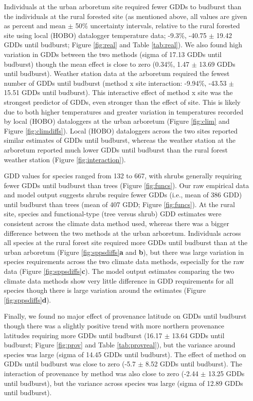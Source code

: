 \documentclass{article}\usepackage[]{graphicx}\usepackage[]{color}
\begin{document}
Individuals at the urban arboretum site required fewer GDDs to budburst than the individuals at the rural forested site (as mentioned above, all values are given as percent and mean $\pm$ 50\% uncertainty intervals, relative to the rural forested site using local (HOBO) datalogger temperature data; -9.3\%, -40.75 $\pm$ 19.42 GDDs until budburst; Figure \ref{fig:real} and Table \ref{tab:real}). We also found high variation in GDDs between the two methods (sigma of 17.13 GDDs until budburst) though the mean effect is close to zero (0.34\%, 1.47 $\pm$ 13.69 GDDs until budburst). Weather station data at the arboretum required the fewest number of GDDs until budburst (method x site interaction: -9.94\%, -43.53 $\pm$ 15.51 GDDs until budburst). This interactive effect of method x site was the strongest predictor of GDDs, even stronger than the effect of site. This is likely due to both higher temperatures and greater variation in temperatures recorded by local (HOBO) dataloggers at the urban arboretum (Figure \ref{fig:clim} and Figure \ref{fig:climdiffs}). Local (HOBO) dataloggers across the two sites reported similar estimates of GDDs until budburst, whereas the weather station at the arboretum reported much lower GDDs until budburst than the rural forest weather station (Figure \ref{fig:interaction}).

GDD values for species ranged from 132 to 667, with shrubs generally requiring fewer GDDs until budburst than trees (Figure \ref{fig:funcs}). Our raw empirical data and model output suggests shrubs require fewer GDDs (i.e., mean of 386 GDD) until budburst than trees (mean of 407 GDD; Figure \ref{fig:funcs}). At the rural site, species and functional-type (tree versus shrub) GDD estimates were consistent across the climate data method used, whereas there was a bigger difference between the two methods at the urban arboretum. Individuals across all species at the rural forest site required more GDDs until budburst than at the urban arboretum (Figure \ref{fig:sppsdiffs}\textbf{a} and \textbf{b}), but there was large variation in species requirements across the two climate data methods, especially for the raw data (Figure \ref{fig:sppsdiffs}\textbf{c}). The model output estimates comparing the two climate data methods show very little difference in GDD requirements for all species though there is large variation around the estimates (Figure \ref{fig:sppsdiffs}\textbf{d}). 

Finally, we found no major effect of provenance latitude on GDDs until budburst though there was a slightly positive trend with more northern provenance latitudes requiring more GDDs until budburst (16.17 $\pm$ 13.64 GDDs until budburst; Figure \ref{fig:prov} and Table \ref{tab:provreal}), but the variance around species was large (sigma of 14.45 GDDs until budburst). The effect of method on GDDs until budburst was close to zero (-5.7 $\pm$ 8.52 GDDs until budburst). The interaction of provenance by method was also close to zero (-2.44 $\pm$ 13.25 GDDs until budburst), but the variance across species was large (sigma of 12.89 GDDs until budburst).
\end{document}

